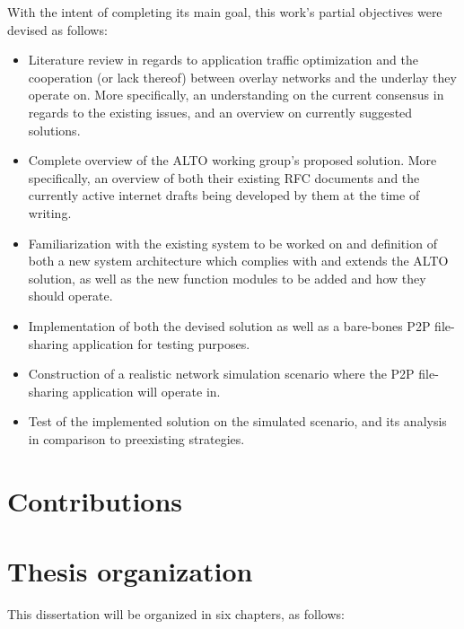 \documentclass[
  oneside,
  11pt, a4paper,
  footinclude=true,
  headinclude=true,
  cleardoublepage=empty
]{scrbook}
\begin{document}
    With the intent of completing its main goal, this work's partial objectives were devised as follows:
    
    \begin{itemize}
        \item Literature review in regards to application traffic optimization and the cooperation (or lack thereof) between overlay networks and the underlay they operate on. More specifically, an understanding on the current consensus in regards to the existing issues, and an overview on currently suggested solutions.
        \item Complete overview of the ALTO working group's proposed solution. More specifically, an overview of both their existing RFC documents and the currently active internet drafts being developed by them at the time of writing. 
        \item Familiarization with the existing system to be worked on and definition of both a new system architecture which complies with and extends the ALTO solution, as well as the new function modules to be added and how they should operate.
        \item Implementation of both the devised solution as well as a bare-bones P2P file-sharing application for testing purposes.
        \item Construction of a realistic network simulation scenario where the P2P file-sharing application will operate in.
        \item Test of the implemented solution on the simulated scenario, and its analysis in comparison to preexisting strategies.
    \end{itemize}
    \section{Contributions}
    
    
    \section{Thesis organization}
    
    This dissertation will be organized in six chapters, as follows:
    
\end{document}
